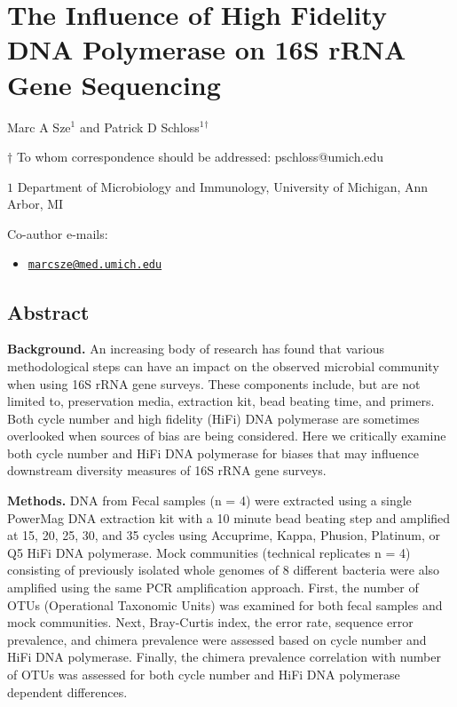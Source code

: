 \documentclass[12pt,]{article}
\title{}
\author{}
\date{}
\providecommand{\tightlist}{%
  \setlength{\itemsep}{0pt}\setlength{\parskip}{0pt}}
\begin{document}
\section{The Influence of High Fidelity DNA Polymerase on 16S rRNA Gene
Sequencing}\label{the-influence-of-high-fidelity-dna-polymerase-on-16s-rrna-gene-sequencing}

\begin{center}
\vspace{25mm}

Marc A Sze${^1}$ and Patrick D Schloss${^1}$${^\dagger}$

\vspace{20mm}

$\dagger$ To whom correspondence should be addressed: pschloss@umich.edu

$1$ Department of Microbiology and Immunology, University of Michigan, Ann Arbor, MI




\end{center}

Co-author e-mails:

\begin{itemize}
\tightlist
\item
  \href{mailto:marcsze@med.umich.edu}{\nolinkurl{marcsze@med.umich.edu}}
\end{itemize}

\newpage

\linenumbers

\subsection{Abstract}\label{abstract}

\textbf{Background.} An increasing body of research has found that
various methodological steps can have an impact on the observed
microbial community when using 16S rRNA gene surveys. These components
include, but are not limited to, preservation media, extraction kit,
bead beating time, and primers. Both cycle number and high fidelity
(HiFi) DNA polymerase are sometimes overlooked when sources of bias are
being considered. Here we critically examine both cycle number and HiFi
DNA polymerase for biases that may influence downstream diversity
measures of 16S rRNA gene surveys.

\textbf{Methods.} DNA from Fecal samples (n = 4) were extracted using a
single PowerMag DNA extraction kit with a 10 minute bead beating step
and amplified at 15, 20, 25, 30, and 35 cycles using Accuprime, Kappa,
Phusion, Platinum, or Q5 HiFi DNA polymerase. Mock communities
(technical replicates n = 4) consisting of previously isolated whole
genomes of 8 different bacteria were also amplified using the same PCR
amplification approach. First, the number of OTUs (Operational Taxonomic
Units) was examined for both fecal samples and mock communities. Next,
Bray-Curtis index, the error rate, sequence error prevalence, and
chimera prevalence were assessed based on cycle number and HiFi DNA
polymerase. Finally, the chimera prevalence correlation with number of
OTUs was assessed for both cycle number and HiFi DNA polymerase
dependent differences.
\end{document}
